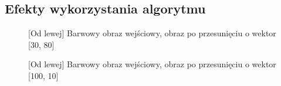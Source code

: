 \documentclass[a4paper,12pt, titlepage]{report}
\begin{document}
\subsection*{Efekty wykorzystania algorytmu}
\begin{figure}[h]
    \centering
    \caption{[Od lewej] Barwowy obraz wejściowy, obraz po przesunięciu o wektor [30, 80]}%
    \label{fig:geo_after_grey1}%
\end{figure}
\FloatBarrier
\begin{figure}[h]
    \centering
    \caption{[Od lewej] Barwowy obraz wejściowy, obraz po przesunięciu o wektor [100, 10]}%
    \label{fig:geo_after_grey1}%
\end{figure}
\FloatBarrier
\end{document}
